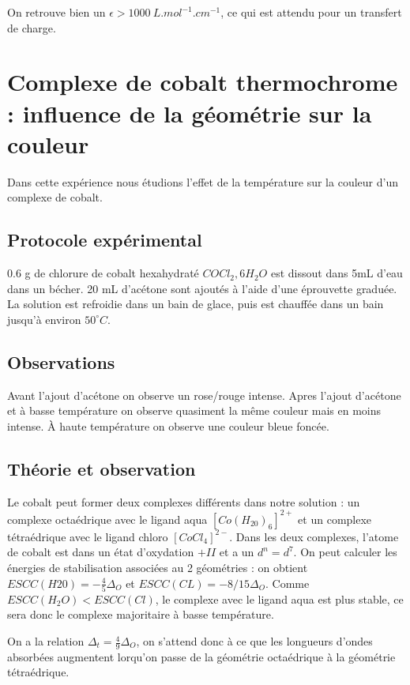 \documentclass[12pt]{article}
\begin{document}
On retrouve bien un $\epsilon > 1000 \ L.mol^{-1}.cm^{-1}$, ce qui est attendu pour un transfert de charge.

\section{Complexe de cobalt thermochrome : influence de la géométrie sur la couleur}

Dans cette expérience nous étudions l'effet de la température sur la couleur d'un complexe de cobalt. 

\subsection{Protocole expérimental}

0.6 g de chlorure de cobalt hexahydraté $COCl_2,6H_2O$ est dissout dans 5mL d'eau dans un bécher. 
20 mL d'acétone sont ajoutés à l'aide d'une éprouvette graduée.
La solution est refroidie dans un bain de glace, puis est chauffée dans un bain jusqu'à environ $50 ^\circ C$.

\subsection{Observations}

Avant l'ajout d'acétone on observe un rose/rouge intense. 
Apres l'ajout d'acétone et à basse température on observe quasiment la même couleur mais en moins intense.
À haute température on observe une couleur bleue foncée.

\subsection{Théorie et observation}

Le cobalt peut former deux complexes différents dans notre solution : un complexe octaédrique avec le ligand aqua $[Co(H_20)_6]^{2+}$ et un complexe tétraédrique avec le ligand chloro $[CoCl_4]^{2-}$.
Dans les deux complexes, l'atome de cobalt est dans un état d'oxydation $+II$ et a un $d^n=d^7$.
On peut calculer les énergies de stabilisation associées au 2 géométries : on obtient $ESCC(H20)=-\frac{4}{5} \Delta_O$ et $ESCC(CL)=-8/15 \Delta_O$.
Comme $ESCC(H_2O)<ESCC(Cl)$, le complexe avec le ligand aqua est plus stable, ce sera donc le complexe majoritaire à basse température.

On a la relation $\Delta_t=\frac{4}{9}\Delta_O$, on s'attend donc à ce que les longueurs d'ondes absorbées augmentent lorqu'on passe de la géométrie octaédrique à la géométrie tétraédrique. 
\end{document}
